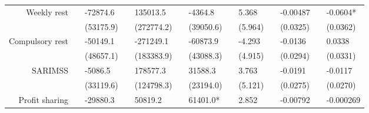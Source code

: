 \begin{tabular}{rrrrrrrrrrrrr}
Weekly rest & \multicolumn{1}{l}{} & \multicolumn{1}{l}{-72874.6} & \multicolumn{1}{l}{} & \multicolumn{1}{l}{135013.5} & \multicolumn{1}{l}{} & \multicolumn{1}{l}{-4364.8} & \multicolumn{1}{l}{} & \multicolumn{1}{l}{5.368} & \multicolumn{1}{l}{} & \multicolumn{1}{l}{-0.00487} & \multicolumn{1}{l}{} & \multicolumn{1}{l}{-0.0604*} \\
      & \multicolumn{1}{l}{} & \multicolumn{1}{l}{(53175.9)} & \multicolumn{1}{l}{} & \multicolumn{1}{l}{(272774.2)} & \multicolumn{1}{l}{} & \multicolumn{1}{l}{(39050.6)} & \multicolumn{1}{l}{} & \multicolumn{1}{l}{(5.964)} & \multicolumn{1}{l}{} & \multicolumn{1}{l}{(0.0325)} & \multicolumn{1}{l}{} & \multicolumn{1}{l}{(0.0362)} \\
Compulsory rest & \multicolumn{1}{l}{} & \multicolumn{1}{l}{-50149.1} & \multicolumn{1}{l}{} & \multicolumn{1}{l}{-271249.1} & \multicolumn{1}{l}{} & \multicolumn{1}{l}{-60873.9} & \multicolumn{1}{l}{} & \multicolumn{1}{l}{-4.293} & \multicolumn{1}{l}{} & \multicolumn{1}{l}{-0.0136} & \multicolumn{1}{l}{} & \multicolumn{1}{l}{0.0338} \\
      & \multicolumn{1}{l}{} & \multicolumn{1}{l}{(48657.1)} & \multicolumn{1}{l}{} & \multicolumn{1}{l}{(183383.9)} & \multicolumn{1}{l}{} & \multicolumn{1}{l}{(43088.3)} & \multicolumn{1}{l}{} & \multicolumn{1}{l}{(4.915)} & \multicolumn{1}{l}{} & \multicolumn{1}{l}{(0.0294)} & \multicolumn{1}{l}{} & \multicolumn{1}{l}{(0.0331)} \\
SARIMSS & \multicolumn{1}{l}{} & \multicolumn{1}{l}{-5086.5} & \multicolumn{1}{l}{} & \multicolumn{1}{l}{178577.3} & \multicolumn{1}{l}{} & \multicolumn{1}{l}{31588.3} & \multicolumn{1}{l}{} & \multicolumn{1}{l}{3.763} & \multicolumn{1}{l}{} & \multicolumn{1}{l}{-0.0191} & \multicolumn{1}{l}{} & \multicolumn{1}{l}{-0.0117} \\
      & \multicolumn{1}{l}{} & \multicolumn{1}{l}{(33119.6)} & \multicolumn{1}{l}{} & \multicolumn{1}{l}{(124798.3)} & \multicolumn{1}{l}{} & \multicolumn{1}{l}{(23194.0)} & \multicolumn{1}{l}{} & \multicolumn{1}{l}{(5.121)} & \multicolumn{1}{l}{} & \multicolumn{1}{l}{(0.0275)} & \multicolumn{1}{l}{} & \multicolumn{1}{l}{(0.0270)} \\
Profit sharing & \multicolumn{1}{l}{} & \multicolumn{1}{l}{-29880.3} & \multicolumn{1}{l}{} & \multicolumn{1}{l}{50819.2} & \multicolumn{1}{l}{} & \multicolumn{1}{l}{61401.0*} & \multicolumn{1}{l}{} & \multicolumn{1}{l}{2.852} & \multicolumn{1}{l}{} & \multicolumn{1}{l}{-0.00792} & \multicolumn{1}{l}{} & \multicolumn{1}{l}{-0.000269} \\

\end{tabular}

